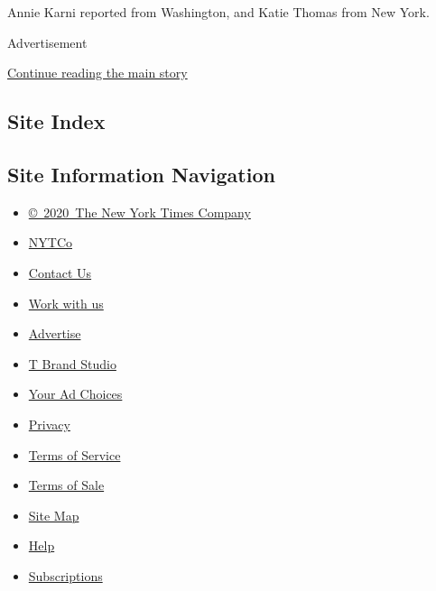 Annie Karni reported from Washington, and Katie Thomas from New York.

Advertisement

\protect\hyperlink{after-bottom}{Continue reading the main story}

\hypertarget{site-index}{%
\subsection{Site Index}\label{site-index}}

\hypertarget{site-information-navigation}{%
\subsection{Site Information
Navigation}\label{site-information-navigation}}

\begin{itemize}
\tightlist
\item
  \href{https://help.nytimes3xbfgragh.onion/hc/en-us/articles/115014792127-Copyright-notice}{©~2020~The
  New York Times Company}
\end{itemize}

\begin{itemize}
\tightlist
\item
  \href{https://www.nytco.com/}{NYTCo}
\item
  \href{https://help.nytimes3xbfgragh.onion/hc/en-us/articles/115015385887-Contact-Us}{Contact
  Us}
\item
  \href{https://www.nytco.com/careers/}{Work with us}
\item
  \href{https://nytmediakit.com/}{Advertise}
\item
  \href{http://www.tbrandstudio.com/}{T Brand Studio}
\item
  \href{https://www.nytimes3xbfgragh.onion/privacy/cookie-policy\#how-do-i-manage-trackers}{Your
  Ad Choices}
\item
  \href{https://www.nytimes3xbfgragh.onion/privacy}{Privacy}
\item
  \href{https://help.nytimes3xbfgragh.onion/hc/en-us/articles/115014893428-Terms-of-service}{Terms
  of Service}
\item
  \href{https://help.nytimes3xbfgragh.onion/hc/en-us/articles/115014893968-Terms-of-sale}{Terms
  of Sale}
\item
  \href{https://spiderbites.nytimes3xbfgragh.onion}{Site Map}
\item
  \href{https://help.nytimes3xbfgragh.onion/hc/en-us}{Help}
\item
  \href{https://www.nytimes3xbfgragh.onion/subscription?campaignId=37WXW}{Subscriptions}
\end{itemize}
